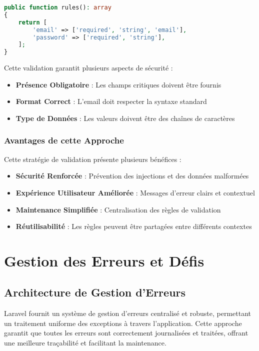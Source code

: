 \documentclass[12pt,a4paper]{report}
\begin{document}
\begin{lstlisting}[language=PHP]
public function rules(): array
{
    return [
        'email' => ['required', 'string', 'email'],
        'password' => ['required', 'string'],
    ];
}
\end{lstlisting}

Cette validation garantit plusieurs aspects de sécurité :

\begin{itemize}
\item \textbf{Présence Obligatoire} : Les champs critiques doivent être fournis
\item \textbf{Format Correct} : L'email doit respecter la syntaxe standard
\item \textbf{Type de Données} : Les valeurs doivent être des chaînes de caractères
\end{itemize}

\subsubsection{Avantages de cette Approche}

Cette stratégie de validation présente plusieurs bénéfices :

\begin{itemize}
\item \textbf{Sécurité Renforcée} : Prévention des injections et des données malformées
\item \textbf{Expérience Utilisateur Améliorée} : Messages d'erreur clairs et contextuel
\item \textbf{Maintenance Simplifiée} : Centralisation des règles de validation
\item \textbf{Réutilisabilité} : Les règles peuvent être partagées entre différents contextes
\end{itemize}

\section{Gestion des Erreurs et Défis}

\subsection{Architecture de Gestion d'Erreurs}

Laravel fournit un système de gestion d'erreurs centralisé et robuste, permettant un traitement uniforme des exceptions à travers l'application. Cette approche garantit que toutes les erreurs sont correctement journalisées et traitées, offrant une meilleure traçabilité et facilitant la maintenance.
\end{document}
